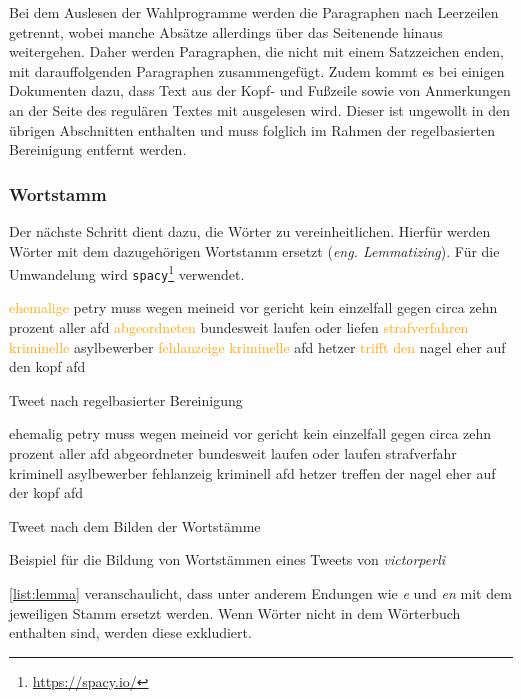 Bei dem Auslesen der Wahlprogramme werden die Paragraphen nach Leerzeilen getrennt, wobei manche Absätze allerdings über das Seitenende hinaus weitergehen. Daher werden Paragraphen, die nicht mit einem Satzzeichen enden, mit darauffolgenden Paragraphen zusammengefügt. Zudem kommt es bei einigen Dokumenten dazu, dass Text aus der Kopf- und Fußzeile sowie von Anmerkungen an der Seite des regulären Textes mit ausgelesen wird. Dieser ist ungewollt in den übrigen Abschnitten enthalten und muss folglich im Rahmen der regelbasierten Bereinigung entfernt werden.

\subsubsection{Wortstamm}

Der nächste Schritt dient dazu, die Wörter zu vereinheitlichen. Hierfür werden Wörter mit dem dazugehörigen Wortstamm ersetzt (\textit{eng. Lemmatizing}). Für die Umwandelung wird \texttt{spacy}\footnote{\href{https://spacy.io/}{https://spacy.io/}} verwendet.

\begin{example}[H]
    {\footnotesize
    \begin{subexample}{0.45\textwidth}
        \textcolor{orange}{ehemalige} petry muss wegen meineid vor gericht kein einzelfall gegen circa zehn prozent aller afd \textcolor{orange}{abgeordneten} bundesweit laufen oder liefen \textcolor{orange}{strafverfahren} \textcolor{orange}{kriminelle} asylbewerber \textcolor{orange}{fehlanzeige} \textcolor{orange}{kriminelle} afd hetzer \textcolor{orange}{trifft} \textcolor{orange}{den} nagel eher auf den kopf afd
        \caption{Tweet nach regelbasierter Bereinigung}
    \end{subexample}\hfill
    \begin{subexample}{0.45\textwidth}
        ehemalig petry muss wegen meineid vor gericht kein einzelfall gegen circa zehn prozent aller afd abgeordneter bundesweit laufen oder laufen strafverfahr kriminell asylbewerber fehlanzeig kriminell afd hetzer treffen der nagel eher auf der kopf afd
        \caption{Tweet nach dem Bilden der Wortstämme}
    \end{subexample}\hfill
    }
    \caption[Bildung von Wortstämmen]{Beispiel für die Bildung von Wortstämmen eines Tweets von \textit{victorperli} \autocite{saltzer_finding_2022}} \label{list:lemma}
\end{example}

\autoref{list:lemma} veranschaulicht, dass unter anderem Endungen wie \textit{e} und \textit{en} mit dem jeweiligen Stamm ersetzt werden. Wenn Wörter nicht in dem Wörterbuch enthalten sind, werden diese exkludiert.

